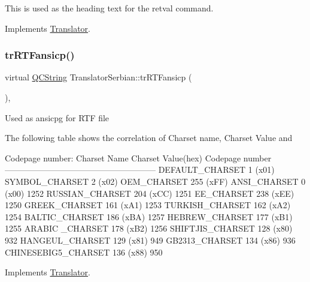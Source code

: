 This is used as the heading text for the retval command. 

Implements \mbox{\hyperlink{class_translator}{Translator}}.

\mbox{\label{class_translator_serbian_af0b81858faf43b63101a83aea2c75e76}} 
\subsubsection{\texorpdfstring{trRTFansicp()}{trRTFansicp()}}
{\footnotesize\ttfamily virtual \mbox{\hyperlink{class_q_c_string}{Q\+C\+String}} Translator\+Serbian\+::tr\+R\+T\+Fansicp (\begin{DoxyParamCaption}{ }\end{DoxyParamCaption})\hspace{0.3cm}{\ttfamily [inline]}, {\ttfamily [virtual]}}

Used as ansicpg for R\+TF file

The following table shows the correlation of Charset name, Charset Value and 
\begin{DoxyPre}
Codepage number:
Charset Name       Charset Value(hex)  Codepage number
------------------------------------------------------
DEFAULT\_CHARSET           1 (x01)
SYMBOL\_CHARSET            2 (x02)
OEM\_CHARSET             255 (xFF)
ANSI\_CHARSET              0 (x00)            1252
RUSSIAN\_CHARSET         204 (xCC)            1251
EE\_CHARSET              238 (xEE)            1250
GREEK\_CHARSET           161 (xA1)            1253
TURKISH\_CHARSET         162 (xA2)            1254
BALTIC\_CHARSET          186 (xBA)            1257
HEBREW\_CHARSET          177 (xB1)            1255
ARABIC \_CHARSET         178 (xB2)            1256
SHIFTJIS\_CHARSET        128 (x80)             932
HANGEUL\_CHARSET         129 (x81)             949
GB2313\_CHARSET          134 (x86)             936
CHINESEBIG5\_CHARSET     136 (x88)             950
\end{DoxyPre}
 

Implements \mbox{\hyperlink{class_translator_a9953a4c0e6a4fc7d017abcd5c2939e0f}{Translator}}.

\mbox{\label{class_translator_serbian_ae1bf7880d6f6e8dac043c21281106949}} 
